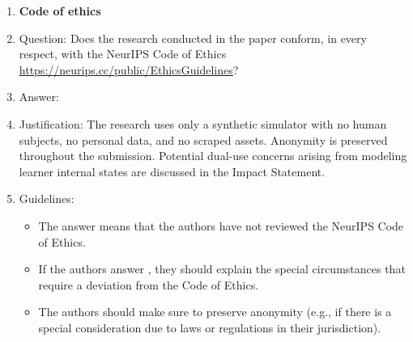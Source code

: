 \begin{enumerate}
\item {\bf Code of ethics}
    \item[] Question: Does the research conducted in the paper conform, in every respect, with the NeurIPS Code of Ethics \url{https://neurips.cc/public/EthicsGuidelines}?
    \item[] Answer: \answerYes{}
    \item[] Justification: The research uses only a synthetic simulator with no human subjects, no personal data, and no scraped assets. Anonymity is preserved throughout the submission. Potential dual-use concerns arising from modeling learner internal states are discussed in the Impact Statement.
    \item[] Guidelines:
    \begin{itemize}
        \item The answer \answerNA{} means that the authors have not reviewed the NeurIPS Code of Ethics.
        \item If the authors answer \answerNo, they should explain the special circumstances that require a deviation from the Code of Ethics.
        \item The authors should make sure to preserve anonymity (e.g., if there is a special consideration due to laws or regulations in their jurisdiction).
    \end{itemize}



\end{enumerate}
